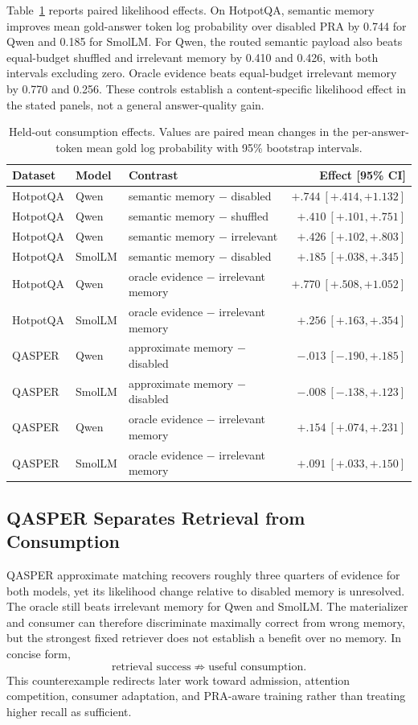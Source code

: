 \documentclass[11pt]{article}
\begin{document}
Table~\ref{tab:gateb-consumption} reports paired likelihood effects. On HotpotQA, semantic memory improves mean gold-answer token log probability over disabled PRA by 0.744 for Qwen and 0.185 for SmolLM. For Qwen, the routed semantic payload also beats equal-budget shuffled and irrelevant memory by 0.410 and 0.426, with both intervals excluding zero. Oracle evidence beats equal-budget irrelevant memory by 0.770 and 0.256. These controls establish a content-specific likelihood effect in the stated panels, not a general answer-quality gain.

\begin{table}[H]
\centering
\small
\caption{Held-out consumption effects. Values are paired mean changes in the per-answer-token mean gold log probability with 95\% bootstrap intervals.}
\label{tab:gateb-consumption}
\begin{tabularx}{\linewidth}{llXr}
\toprule
Dataset & Model & Contrast & Effect [95\% CI]\\
\midrule
HotpotQA & Qwen & semantic memory $-$ disabled & $+.744\ [+.414,+1.132]$\\
HotpotQA & Qwen & semantic memory $-$ shuffled & $+.410\ [+.101,+.751]$\\
HotpotQA & Qwen & semantic memory $-$ irrelevant & $+.426\ [+.102,+.803]$\\
HotpotQA & SmolLM & semantic memory $-$ disabled & $+.185\ [+.038,+.345]$\\
HotpotQA & Qwen & oracle evidence $-$ irrelevant memory & $+.770\ [+.508,+1.052]$\\
HotpotQA & SmolLM & oracle evidence $-$ irrelevant memory & $+.256\ [+.163,+.354]$\\
QASPER & Qwen & approximate memory $-$ disabled & $-.013\ [-.190,+.185]$\\
QASPER & SmolLM & approximate memory $-$ disabled & $-.008\ [-.138,+.123]$\\
QASPER & Qwen & oracle evidence $-$ irrelevant memory & $+.154\ [+.074,+.231]$\\
QASPER & SmolLM & oracle evidence $-$ irrelevant memory & $+.091\ [+.033,+.150]$\\
\bottomrule
\end{tabularx}
\end{table}

\subsection{QASPER Separates Retrieval from Consumption}
QASPER approximate matching recovers roughly three quarters of evidence for both models, yet its likelihood change relative to disabled memory is unresolved. The oracle still beats irrelevant memory for Qwen and SmolLM. The materializer and consumer can therefore discriminate maximally correct from wrong memory, but the strongest fixed retriever does not establish a benefit over no memory. In concise form,
\[
\text{retrieval success}\not\Rightarrow\text{useful consumption}.
\]
This counterexample redirects later work toward admission, attention competition, consumer adaptation, and PRA-aware training rather than treating higher recall as sufficient.
\end{document}
